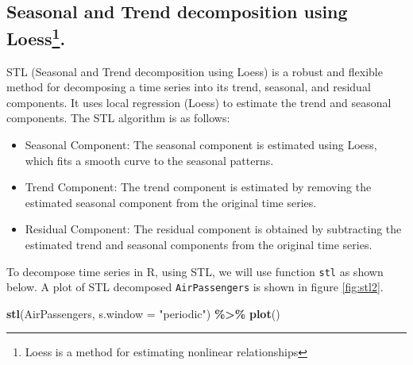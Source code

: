 \documentclass[
]{book}
\newenvironment{Shaded}{\begin{snugshade}}{\end{snugshade}}
\newcommand{\AttributeTok}[1]{\textcolor[rgb]{0.13,0.29,0.53}{#1}}
\newcommand{\FunctionTok}[1]{\textcolor[rgb]{0.13,0.29,0.53}{\textbf{#1}}}
\newcommand{\NormalTok}[1]{#1}
\newcommand{\SpecialCharTok}[1]{\textcolor[rgb]{0.81,0.36,0.00}{\textbf{#1}}}
\newcommand{\StringTok}[1]{\textcolor[rgb]{0.31,0.60,0.02}{#1}}
\providecommand{\tightlist}{%
  \setlength{\itemsep}{0pt}\setlength{\parskip}{0pt}}
\begin{document}
\hypertarget{seasonal-and-trend-decomposition-using-loess.}{%
\subsection[Seasonal and Trend decomposition using Loess.]{\texorpdfstring{Seasonal and Trend decomposition using Loess\footnote{Loess is a method for estimating nonlinear relationships}.}{Seasonal and Trend decomposition using Loess.}}\label{seasonal-and-trend-decomposition-using-loess.}}

STL (Seasonal and Trend decomposition using Loess) is a robust and flexible method for decomposing a time series into its trend, seasonal, and residual components. It uses local regression (Loess) to estimate the trend and seasonal components. The STL algorithm is as follows:

\begin{itemize}
\tightlist
\item
  Seasonal Component: The seasonal component is estimated using Loess, which fits a smooth curve to the seasonal patterns.
\item
  Trend Component: The trend component is estimated by removing the estimated seasonal component from the original time series.
\item
  Residual Component: The residual component is obtained by subtracting the estimated trend and seasonal components from the original time series.
\end{itemize}

To decompose time series in R, using STL, we will use function \texttt{stl} as shown below. A plot of STL decomposed \texttt{AirPassengers} is shown in figure \ref{fig:stl2}.

\begin{Shaded}
\begin{Highlighting}[]
\FunctionTok{stl}\NormalTok{(AirPassengers, }\AttributeTok{s.window =} \StringTok{"periodic"}\NormalTok{) }\SpecialCharTok{\%\textgreater{}\%} 
  \FunctionTok{plot}\NormalTok{()}
\end{Highlighting}
\end{Shaded}
\end{document}
